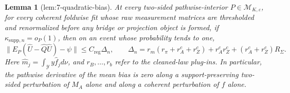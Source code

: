 \documentclass{article}
\newtheorem{lemma}{Lemma}
\begin{document}
\begin{lemma}[lem:7-quadratic-bias]\label{lem:7-quadratic-bias}
At every two-sided pathwise-interior \(P\in\mathcal M_{K,\varepsilon}\), for every coherent foldwise fit whose raw measurement matrices are thresholded and renormalized before any bridge or projection object is formed, if \(\kappa_{\mathrm{supp},n}=o_P(1)\), then on an event whose probability tends to one,
\[
 \|E_P(\widehat U-\widehat Q\widehat U)-\psi\|
 \leq C_{\mathrm{reg}}\Delta_n,
 \qquad
 \Delta_n=r_m(r_\pi+r_A^c+r_Z^c)+r_A^cr_Z^c
 +(r_A^c+r_Z^c)R_\Sigma.
\]
Here \(\widehat m_j=\int_{\mathcal Y}y\widehat f_jd\nu\), and \(r_B,\ldots,r_b\) refer to the cleaned-law plug-ins.  In particular, the pathwise derivative of the mean bias is zero along a support-preserving two-sided perturbation of \(M_A\) alone and along a coherent perturbation of \(f\) alone.
\end{lemma}
\end{document}
